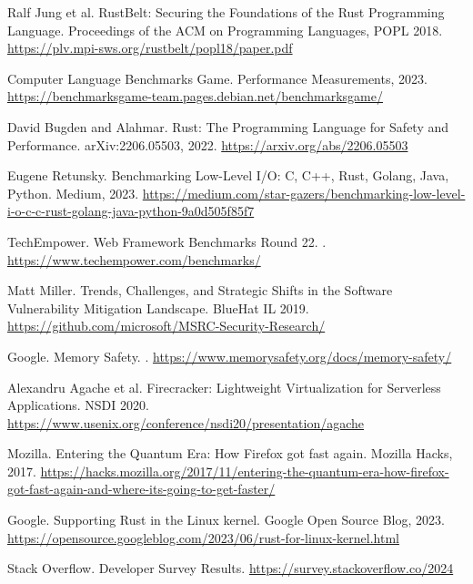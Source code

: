 \documentclass[11pt]{article}
\begin{document}
\begin{thebibliography}{99}
Ralf Jung et al.
\newblock RustBelt: Securing the Foundations of the Rust Programming Language.
\newblock Proceedings of the ACM on Programming Languages, POPL 2018.
\newblock \url{https://plv.mpi-sws.org/rustbelt/popl18/paper.pdf}

Computer Language Benchmarks Game.
\newblock Performance Measurements, 2023.
\newblock \url{https://benchmarksgame-team.pages.debian.net/benchmarksgame/}

David Bugden and Alahmar.
\newblock Rust: The Programming Language for Safety and Performance.
\newblock arXiv:2206.05503, 2022.
\newblock \url{https://arxiv.org/abs/2206.05503}

Eugene Retunsky.
\newblock Benchmarking Low-Level I/O: C, C++, Rust, Golang, Java, Python.
\newblock Medium, 2023.
\newblock \url{https://medium.com/star-gazers/benchmarking-low-level-i-o-c-c-rust-golang-java-python-9a0d505f85f7}

TechEmpower.
\newblock Web Framework Benchmarks Round 22.
.
\newblock \url{https://www.techempower.com/benchmarks/}

Matt Miller.
\newblock Trends, Challenges, and Strategic Shifts in the Software Vulnerability Mitigation Landscape.
\newblock BlueHat IL 2019.
\newblock \url{https://github.com/microsoft/MSRC-Security-Research/}

Google.
\newblock Memory Safety.
.
\newblock \url{https://www.memorysafety.org/docs/memory-safety/}

Alexandru Agache et al.
\newblock Firecracker: Lightweight Virtualization for Serverless Applications.
\newblock NSDI 2020.
\newblock \url{https://www.usenix.org/conference/nsdi20/presentation/agache}

Mozilla.
\newblock Entering the Quantum Era: How Firefox got fast again.
\newblock Mozilla Hacks, 2017.
\newblock \url{https://hacks.mozilla.org/2017/11/entering-the-quantum-era-how-firefox-got-fast-again-and-where-its-going-to-get-faster/}

Google.
\newblock Supporting Rust in the Linux kernel.
\newblock Google Open Source Blog, 2023.
\newblock \url{https://opensource.googleblog.com/2023/06/rust-for-linux-kernel.html}

Stack Overflow.
 Developer Survey Results.
\newblock \url{https://survey.stackoverflow.co/2024}


\end{thebibliography}
\end{document}
